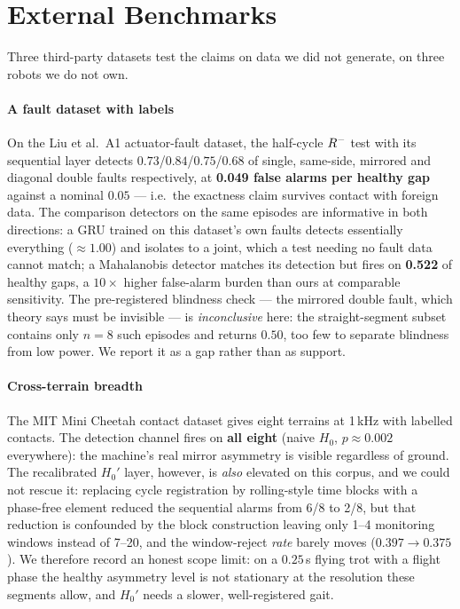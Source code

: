 \section{External Benchmarks}
\label{sec:external}

Three third-party datasets test the claims on data we did not generate, on three robots we do not own.

\paragraph{A fault dataset with labels}
On the Liu et al.\ A1 actuator-fault dataset, the half-cycle $R^{-}$ test with its sequential layer detects
$0.73$/$0.84$/$0.75$/$0.68$ of single, same-side, mirrored and diagonal double faults respectively, at
\textbf{0.049 false alarms per healthy gap} against a nominal $0.05$ --- i.e.\ the exactness claim survives contact with
foreign data. The comparison detectors on the same episodes are informative in both directions: a GRU trained on this
dataset's own faults detects essentially everything ($\approx1.00$) and isolates to a joint, which a test needing no
fault data cannot match; a Mahalanobis detector matches its detection but fires on \textbf{0.522} of healthy gaps, a
$10\times$ higher false-alarm burden than ours at comparable sensitivity. The pre-registered blindness check --- the
mirrored double fault, which theory says must be invisible --- is \emph{inconclusive} here: the straight-segment subset
contains only $n=8$ such episodes and returns $0.50$, too few to separate blindness from low power. We report it as a
gap rather than as support.

\paragraph{Cross-terrain breadth}
The MIT Mini Cheetah contact dataset gives eight terrains at 1\,kHz with labelled contacts. The detection channel fires
on \textbf{all eight} (naive $H_0$, $p\approx0.002$ everywhere): the machine's real mirror asymmetry is visible
regardless of ground. The recalibrated $H_0'$ layer, however, is \emph{also} elevated on this corpus, and we could not
rescue it: replacing cycle registration by rolling-style time blocks with a phase-free element reduced the sequential
alarms from 6/8 to 2/8, but that reduction is confounded by the block construction leaving only 1--4 monitoring windows
instead of 7--20, and the window-reject \emph{rate} barely moves ($0.397\to0.375$). We therefore record an honest scope
limit: on a $0.25$\,s flying trot with a flight phase the healthy asymmetry level is not stationary at the resolution
these segments allow, and $H_0'$ needs a slower, well-registered gait.

